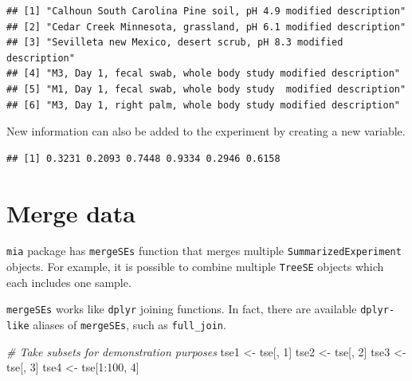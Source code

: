 \documentclass[
]{book}
\newenvironment{Shaded}{\begin{snugshade}}{\end{snugshade}}
\newcommand{\CommentTok}[1]{\textcolor[rgb]{0.56,0.35,0.01}{\textit{#1}}}
\newcommand{\DecValTok}[1]{\textcolor[rgb]{0.00,0.00,0.81}{#1}}
\newcommand{\FunctionTok}[1]{\textcolor[rgb]{0.00,0.00,0.00}{#1}}
\newcommand{\NormalTok}[1]{#1}
\newcommand{\OtherTok}[1]{\textcolor[rgb]{0.56,0.35,0.01}{#1}}
\newcommand{\SpecialCharTok}[1]{\textcolor[rgb]{0.00,0.00,0.00}{#1}}
\begin{document}
\begin{verbatim}
## [1] "Calhoun South Carolina Pine soil, pH 4.9 modified description"  
## [2] "Cedar Creek Minnesota, grassland, pH 6.1 modified description"  
## [3] "Sevilleta new Mexico, desert scrub, pH 8.3 modified description"
## [4] "M3, Day 1, fecal swab, whole body study modified description"   
## [5] "M1, Day 1, fecal swab, whole body study  modified description"  
## [6] "M3, Day 1, right palm, whole body study modified description"
\end{verbatim}

New information can also be added to the experiment by creating a new variable.

\begin{Shaded}
\end{Shaded}

\begin{verbatim}
## [1] 0.3231 0.2093 0.7448 0.9334 0.2946 0.6158
\end{verbatim}

\hypertarget{merge-data}{%
\section{Merge data}\label{merge-data}}

\texttt{mia} package has \texttt{mergeSEs} function that merges multiple \texttt{SummarizedExperiment}
objects. For example, it is possible to combine multiple \texttt{TreeSE} objects which each
includes one sample.

\texttt{mergeSEs} works like \texttt{dplyr} joining functions. In fact, there are available
\texttt{dplyr-like} aliases of \texttt{mergeSEs}, such as \texttt{full\_join}.

\begin{Shaded}
\begin{Highlighting}[]
\CommentTok{\# Take subsets for demonstration purposes}
\NormalTok{tse1 }\OtherTok{\textless{}{-}}\NormalTok{ tse[, }\DecValTok{1}\NormalTok{]}
\NormalTok{tse2 }\OtherTok{\textless{}{-}}\NormalTok{ tse[, }\DecValTok{2}\NormalTok{]}
\NormalTok{tse3 }\OtherTok{\textless{}{-}}\NormalTok{ tse[, }\DecValTok{3}\NormalTok{]}
\NormalTok{tse4 }\OtherTok{\textless{}{-}}\NormalTok{ tse[}\DecValTok{1}\SpecialCharTok{:}\DecValTok{100}\NormalTok{, }\DecValTok{4}\NormalTok{]}
\end{Highlighting}
\end{Shaded}
\end{document}
